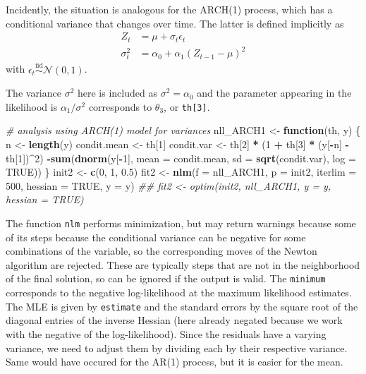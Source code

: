 \documentclass[]{book}
\newenvironment{Shaded}{\begin{snugshade}}{\end{snugshade}}
\newcommand{\CommentTok}[1]{\textcolor[rgb]{0.56,0.35,0.01}{\textit{#1}}}
\newcommand{\ControlFlowTok}[1]{\textcolor[rgb]{0.13,0.29,0.53}{\textbf{#1}}}
\newcommand{\DataTypeTok}[1]{\textcolor[rgb]{0.13,0.29,0.53}{#1}}
\newcommand{\DecValTok}[1]{\textcolor[rgb]{0.00,0.00,0.81}{#1}}
\newcommand{\FloatTok}[1]{\textcolor[rgb]{0.00,0.00,0.81}{#1}}
\newcommand{\KeywordTok}[1]{\textcolor[rgb]{0.13,0.29,0.53}{\textbf{#1}}}
\newcommand{\NormalTok}[1]{#1}
\newcommand{\OperatorTok}[1]{\textcolor[rgb]{0.81,0.36,0.00}{\textbf{#1}}}
\newcommand{\OtherTok}[1]{\textcolor[rgb]{0.56,0.35,0.01}{#1}}
\newcommand{\StringTok}[1]{\textcolor[rgb]{0.31,0.60,0.02}{#1}}
\begin{document}
Incidently, the situation is analogous for the ARCH(1) process, which has a conditional variance that changes over time. The latter is defined implicitly as
\begin{align*}
Z_t &= \mu + \sigma_t\epsilon_t\\
\sigma_t^2 &=\alpha_0+\alpha_1(Z_{t-1}-\mu)^2 
\end{align*}
with \(\epsilon_t \stackrel{\mathrm{iid}}{\sim} \mathcal{N}(0, 1)\).

The variance \(\sigma^2\) here is included as \(\sigma^2=\alpha_0\) and the parameter appearing in the likelihood is \(\alpha_1/\sigma^2\) corresponds to \(\theta_3\), or \texttt{th{[}3{]}}.

\begin{Shaded}
\begin{Highlighting}[]
\CommentTok{# analysis using ARCH(1) model for variances}
\NormalTok{nll_ARCH1 <-}\StringTok{ }\ControlFlowTok{function}\NormalTok{(th, y) \{}
\NormalTok{    n <-}\StringTok{ }\KeywordTok{length}\NormalTok{(y)}
\NormalTok{    condit.mean <-}\StringTok{ }\NormalTok{th[}\DecValTok{1}\NormalTok{]}
\NormalTok{    condit.var <-}\StringTok{ }\NormalTok{th[}\DecValTok{2}\NormalTok{] }\OperatorTok{*}\StringTok{ }\NormalTok{(}\DecValTok{1} \OperatorTok{+}\StringTok{ }\NormalTok{th[}\DecValTok{3}\NormalTok{] }\OperatorTok{*}\StringTok{ }\NormalTok{(y[}\OperatorTok{-}\NormalTok{n] }\OperatorTok{-}\StringTok{ }\NormalTok{th[}\DecValTok{1}\NormalTok{])}\OperatorTok{^}\DecValTok{2}\NormalTok{)}
    \OperatorTok{-}\KeywordTok{sum}\NormalTok{(}\KeywordTok{dnorm}\NormalTok{(y[}\OperatorTok{-}\DecValTok{1}\NormalTok{], }\DataTypeTok{mean =}\NormalTok{ condit.mean, }\DataTypeTok{sd =} \KeywordTok{sqrt}\NormalTok{(condit.var), }\DataTypeTok{log =} \OtherTok{TRUE}\NormalTok{))}
\NormalTok{\}}
\NormalTok{init2 <-}\StringTok{ }\KeywordTok{c}\NormalTok{(}\DecValTok{0}\NormalTok{, }\DecValTok{1}\NormalTok{, }\FloatTok{0.5}\NormalTok{)}
\NormalTok{fit2 <-}\StringTok{ }\KeywordTok{nlm}\NormalTok{(}\DataTypeTok{f =}\NormalTok{ nll_ARCH1, }\DataTypeTok{p =}\NormalTok{ init2, }\DataTypeTok{iterlim =} \DecValTok{500}\NormalTok{, }\DataTypeTok{hessian =} \OtherTok{TRUE}\NormalTok{, }\DataTypeTok{y =}\NormalTok{ y)}
\CommentTok{## fit2 <- optim(init2, nll_ARCH1, y = y, hessian = TRUE)}
\end{Highlighting}
\end{Shaded}

The function \texttt{nlm} performs minimization, but may return warnings because some of its steps because the conditional variance can be negative for some combinations of the variable, so the corresponding moves of the Newton algorithm are rejected. These are typically steps that are not in the neighborhood of the final solution, so can be ignored if the output is valid. The \texttt{minimum} corresponds to the negative log-likelihood at the maximum likelihood estimates. The MLE is given by \texttt{estimate} and the standard errors by the square root of the diagonal entries of the inverse Hessian (here already negated because we work with the negative of the log-likelihood). Since the residuals have a varying variance, we need to adjust them by dividing each by their respective variance. Same would have occured for the AR(1) process, but it is easier for the mean.
\end{document}
